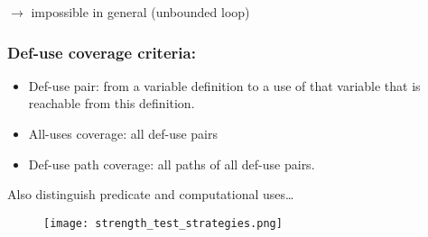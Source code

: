 $\rightarrow$ impossible in general (unbounded loop)

\subsubsection{Def-use coverage criteria:}

\begin{itemize}
    \item Def-use pair: from a variable definition to a use of that variable that is reachable from this definition.
    \item All-uses coverage: all def-use pairs
    \item Def-use path coverage: all paths of all def-use pairs.
\end{itemize}

Also distinguish predicate and computational uses\ldots

\begin{figure}[!ht]
    \centering
    \texttt{[image: strength\_test\_strategies.png]}
\end{figure}
